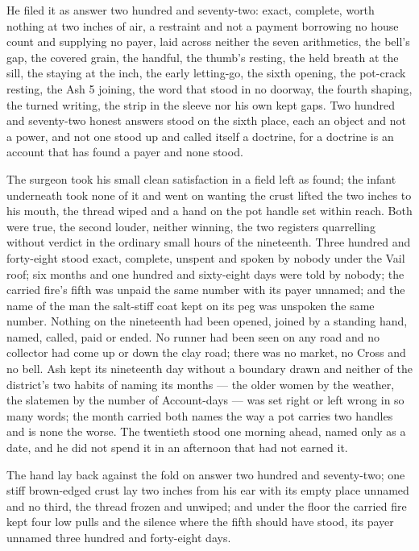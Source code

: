 He filed it as answer two hundred and seventy-two: exact, complete, worth nothing at two inches of air, a restraint and not a payment borrowing no house count and supplying no payer, laid across neither the seven arithmetics, the bell’s gap, the covered grain, the handful, the thumb’s resting, the held breath at the sill, the staying at the inch, the early letting-go, the sixth opening, the pot-crack resting, the Ash 5 joining, the word that stood in no doorway, the fourth shaping, the turned writing, the strip in the sleeve nor his own kept gaps. Two hundred and seventy-two honest answers stood on the sixth place, each an object and not a power, and not one stood up and called itself a doctrine, for a doctrine is an account that has found a payer and none stood.

The surgeon took his small clean satisfaction in a field left as found; the infant underneath took none of it and went on wanting the crust lifted the two inches to his mouth, the thread wiped and a hand on the pot handle set within reach. Both were true, the second louder, neither winning, the two registers quarrelling without verdict in the ordinary small hours of the nineteenth. Three hundred and forty-eight stood exact, complete, unspent and spoken by nobody under the Vail roof; six months and one hundred and sixty-eight days were told by nobody; the carried fire’s fifth was unpaid the same number with its payer unnamed; and the name of the man the salt-stiff coat kept on its peg was unspoken the same number. Nothing on the nineteenth had been opened, joined by a standing hand, named, called, paid or ended. No runner had been seen on any road and no collector had come up or down the clay road; there was no market, no Cross and no bell. Ash kept its nineteenth day without a boundary drawn and neither of the district’s two habits of naming its months --- the older women by the weather, the slatemen by the number of Account-days --- was set right or left wrong in so many words; the month carried both names the way a pot carries two handles and is none the worse. The twentieth stood one morning ahead, named only as a date, and he did not spend it in an afternoon that had not earned it.

The hand lay back against the fold on answer two hundred and seventy-two; one stiff brown-edged crust lay two inches from his ear with its empty place unnamed and no third, the thread frozen and unwiped; and under the floor the carried fire kept four low pulls and the silence where the fifth should have stood, its payer unnamed three hundred and forty-eight days.
